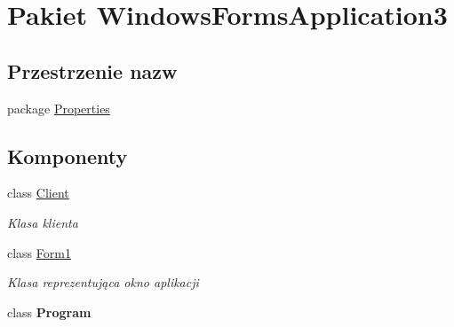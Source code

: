 \hypertarget{namespace_windows_forms_application3}{}\section{Pakiet Windows\+Forms\+Application3}
\label{namespace_windows_forms_application3}
\subsection*{Przestrzenie nazw}
\begin{DoxyCompactItemize}
\item 
package \hyperlink{namespace_windows_forms_application3_1_1_properties}{Properties}
\end{DoxyCompactItemize}
\subsection*{Komponenty}
\begin{DoxyCompactItemize}
\item 
class \hyperlink{class_windows_forms_application3_1_1_client}{Client}
\begin{DoxyCompactList}\small\item\em Klasa klienta \end{DoxyCompactList}\item 
class \hyperlink{class_windows_forms_application3_1_1_form1}{Form1}
\begin{DoxyCompactList}\small\item\em Klasa reprezentująca okno aplikacji \end{DoxyCompactList}\item 
class {\bfseries Program}
\end{DoxyCompactItemize}
